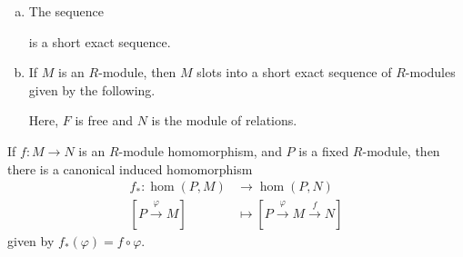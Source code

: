 \documentclass[10pt]{mypackage}
\begin{document}
\begin{example}\hfill
  \begin{enumerate}[(a)]
    \item The sequence
      \begin{center}
      \end{center}
      is a short exact sequence.
    \item If $M$ is an $R$-module, then $M$ slots into a short exact sequence of $R$-modules given by the following.
      \begin{center}
      \end{center}
      Here, $F$ is free and $N$ is the module of relations.
  \end{enumerate}
\end{example}
If $f\colon M\rightarrow N$ is an $R$-module homomorphism, and $P$ is a fixed $R$-module, then there is a canonical induced homomorphism
\begin{align*}
  f_{\ast}\colon \hom\left( P,M \right) &\rightarrow \hom\left( P,N \right)\\
  \left[ P\xrightarrow{\varphi}M \right] &\mapsto \left[ P\xrightarrow{\varphi}M\xrightarrow{f}N \right]
\end{align*}
given by $f_{\ast}\left( \varphi \right) = f\circ\varphi$.
\end{document}
